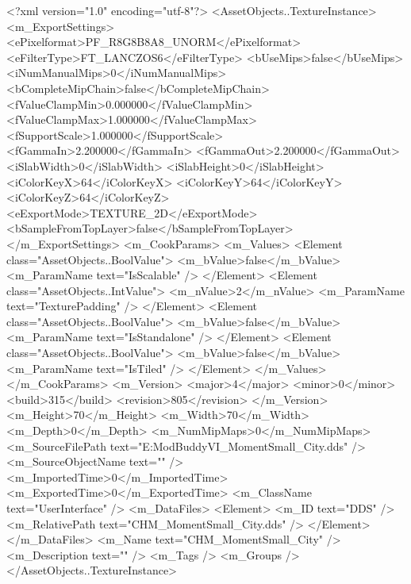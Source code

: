 ﻿<?xml version="1.0" encoding="utf-8"?>
<AssetObjects..TextureInstance>
  <m_ExportSettings>
    <ePixelformat>PF_R8G8B8A8_UNORM</ePixelformat>
    <eFilterType>FT_LANCZOS6</eFilterType>
    <bUseMips>false</bUseMips>
    <iNumManualMips>0</iNumManualMips>
    <bCompleteMipChain>false</bCompleteMipChain>
    <fValueClampMin>0.000000</fValueClampMin>
    <fValueClampMax>1.000000</fValueClampMax>
    <fSupportScale>1.000000</fSupportScale>
    <fGammaIn>2.200000</fGammaIn>
    <fGammaOut>2.200000</fGammaOut>
    <iSlabWidth>0</iSlabWidth>
    <iSlabHeight>0</iSlabHeight>
    <iColorKeyX>64</iColorKeyX>
    <iColorKeyY>64</iColorKeyY>
    <iColorKeyZ>64</iColorKeyZ>
    <eExportMode>TEXTURE_2D</eExportMode>
    <bSampleFromTopLayer>false</bSampleFromTopLayer>
  </m_ExportSettings>
  <m_CookParams>
    <m_Values>
      <Element class="AssetObjects..BoolValue">
        <m_bValue>false</m_bValue>
        <m_ParamName text="IsScalable" />
      </Element>
      <Element class="AssetObjects..IntValue">
        <m_nValue>2</m_nValue>
        <m_ParamName text="TexturePadding" />
      </Element>
      <Element class="AssetObjects..BoolValue">
        <m_bValue>false</m_bValue>
        <m_ParamName text="IsStandalone" />
      </Element>
      <Element class="AssetObjects..BoolValue">
        <m_bValue>false</m_bValue>
        <m_ParamName text="IsTiled" />
      </Element>
    </m_Values>
  </m_CookParams>
  <m_Version>
    <major>4</major>
    <minor>0</minor>
    <build>315</build>
    <revision>805</revision>
  </m_Version>
  <m_Height>70</m_Height>
  <m_Width>70</m_Width>
  <m_Depth>0</m_Depth>
  <m_NumMipMaps>0</m_NumMipMaps>
  <m_SourceFilePath text="E:\Documents\Firaxis ModBuddy\Civilization VI\ColoredHistoricMoments\ColoredHistoricMoments\Textures\CHM_MomentSmall_City.dds" />
  <m_SourceObjectName text="" />
  <m_ImportedTime>0</m_ImportedTime>
  <m_ExportedTime>0</m_ExportedTime>
  <m_ClassName text="UserInterface" />
  <m_DataFiles>
    <Element>
      <m_ID text="DDS" />
      <m_RelativePath text="CHM_MomentSmall_City.dds" />
    </Element>
  </m_DataFiles>
  <m_Name text="CHM_MomentSmall_City" />
  <m_Description text="" />
  <m_Tags />
  <m_Groups />
</AssetObjects..TextureInstance>